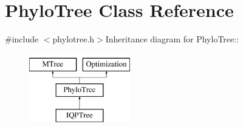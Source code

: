 \hypertarget{classPhyloTree}{
\section{PhyloTree Class Reference}
\label{classPhyloTree}
}


{\ttfamily \#include $<$phylotree.h$>$}Inheritance diagram for PhyloTree::\begin{figure}[H]
\begin{center}
\leavevmode
\includegraphics[height=3cm]{classPhyloTree}
\end{center}
\end{figure}
